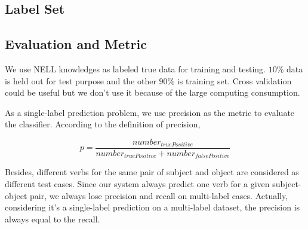 \subsection{Label Set}


\subsection{Evaluation and Metric}

We use NELL knowledges as labeled true data for training and testing. $10\%$ data is held out for test purpose and the other $90\%$ is training set. Cross validation could be useful but we don't use it because of the large computing consumption.

As a single-label prediction problem, we use precision as the metric to evaluate the classifier. According to the definition of precision,

\begin{equation}
	p = \frac{number_{truePositive}}{number_{truePositive} + number_{falsePositive}}
\end{equation}

Besides, different verbs for the same pair of subject and object are considered as different test cases. Since our system always predict one verb for a given subject-object pair, we always lose precision and recall on multi-label cases. Actually, considering it's a single-label prediction on a multi-label dataset, the precision is always equal to the recall.




